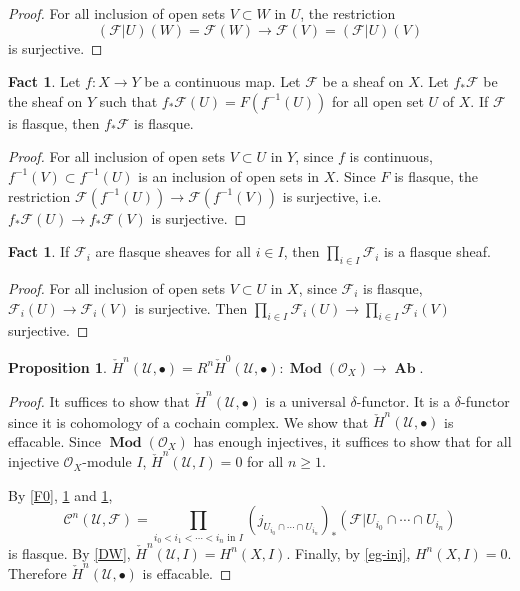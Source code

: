 \documentclass{amsart}
\numberwithin{equation}{section}
\theoremstyle{plain}
\theoremstyle{definition}
\newtheorem{prop}[equation]{Proposition}
\newtheorem{fact}[equation]{Fact}
\DeclareMathOperator{\Ab}{\mathbf{Ab}}
\DeclareMathOperator{\Mod}{\mathbf{Mod}}
\begin{document}
\begin{proof}
	For all inclusion of open sets $ V\subset W $ in $ U $, the restriction
	\[(\mathscr F|U)(W)=\mathscr F(W)\to \mathscr F(V)=(\mathscr F|U)(V)\]
	is surjective. 
\end{proof}

\begin{fact}\label{F1}
	Let $ f:X\to Y $ be a continuous map. 
	Let $ \mathscr F $ be a sheaf on $ X $. 
	Let $ f_*\mathscr F $ be the sheaf on $ Y $ such that $ f_*\mathscr F(U)=F(f^{-1}(U)) $ for all open set $ U $ of $ X $. 
	If $ \mathscr F $ is flasque, then $ f_*\mathscr F $ is flasque. 
\end{fact}

\begin{proof}
	For all inclusion of open sets $ V\subset U $ in $ Y $, since $ f $ is continuous, $ f^{-1}(V)\subset f^{-1}(U) $ is an inclusion of open sets in $ X $. 
	Since $ F $ is flasque, the restriction $ \mathscr F(f^{-1}(U))\to \mathscr F(f^{-1}(V)) $ is surjective, i.e.~$ f_*\mathscr F(U)\to f_*\mathscr F(V) $ is surjective. 
\end{proof}

\begin{fact}\label{F2}
	If $ \mathscr F_i $ are flasque sheaves for all $ i\in I $, then $ \prod\limits_{i\in I} \mathscr F_i$ is a flasque sheaf. 
\end{fact}

\begin{proof}
	For all inclusion of open sets $ V\subset U $ in $ X $, since $ \mathscr F_i $ is flasque, $ \mathscr F_i(U)\to \mathscr F_i(V) $ is surjective. 
	Then $ \prod\limits_{i\in I}\mathscr F_i(U)\to  \prod\limits_{i\in I}\mathscr F_i(V)$  surjective. 
\end{proof}

\begin{prop}\label{derived}
	$ \check{H}^n(\mathscr U, \bullet)=R^n\check{H}^0(\mathscr U, \bullet):\Mod(\mathcal O_X)\to \Ab $. 
\end{prop}

\begin{proof}
	It suffices to show that $ \check{H}^n(\mathscr U, \bullet) $ is a universal $ \delta $-functor. It is a $ \delta $-functor since it is cohomology of a cochain complex. 
	We show that $ \check{H}^n(\mathscr U, \bullet) $ is effacable. 
	Since $ \Mod(\mathcal O_X) $ has enough injectives, it suffices to show that for all injective $ \mathcal O_X $-module $ I $, $\check{H}^n(\mathscr U, I)=0$ for all $ n\ge 1 $. 
	
	By \cref{F0}, \cref{F1} and \cref{F2}, $$ \mathscr C^n(\mathscr U, \mathscr F)=\prod\limits_{i_0<i_1<\cdots<i_n\text{ in } I}(j_{U_{i_0}\cap\cdots \cap U_{i_n}})_*(\mathscr F|U_{i_0}\cap\cdots \cap U_{i_n}) $$ is flasque. 
	By \cref{DW}, $\check{H}^n(\mathscr U, I)=H^n(X, I)$. 
	Finally, by \cref{eg-inj}, $ H^n(X,I)=0 $. Therefore $ \check{H}^n(\mathscr U, \bullet) $ is effacable. 
\end{proof}
\end{document}

